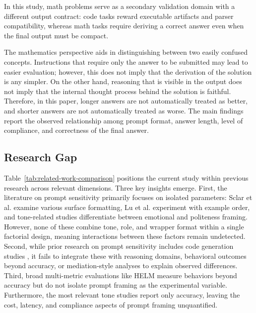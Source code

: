 \documentclass{llncs}
\begin{document}
In this study, math problems serve as a secondary validation domain with a different output contract: code tasks reward executable artifacts and parser compatibility, whereas math tasks require deriving a correct answer even when the final output must be compact.

The mathematics perspective aids in distinguishing between two easily confused concepts. Instructions that require only the answer to be submitted may lead to easier evaluation; however, this does not imply that the derivation of the solution is any simpler. On the other hand, reasoning that is visible in the output does not imply that the internal thought process behind the solution is faithful. Therefore, in this paper, longer answers are not automatically treated as better, and shorter answers are not automatically treated as worse. The main findings report the observed relationship among prompt format, answer length, level of compliance, and correctness of the final answer.

\subsection{Research Gap}\label{research-gap}

Table~\ref{tab:related-work-comparison} positions the current study within previous research across relevant dimensions. Three key insights emerge. First, the literature on prompt sensitivity primarily focuses on isolated parameters: Sclar et al. \citep{sclar2023spurious} examine various surface formatting, Lu et al. \citep{lu2021fantastically} experiment with example order, and tone-related studies \citep{li2023emotionprompt,yin2024politeness} differentiate between emotional and politeness framing. However, none of these combine tone, role, and wrapper format within a single factorial design, meaning interactions between these factors remain undetected. Second, while prior research on prompt sensitivity includes code generation studies \citep{zhuo2024prosa}, it fails to integrate these with reasoning domains, behavioral outcomes beyond accuracy, or mediation-style analyses to explain observed differences. Third, broad multi-metric evaluations like HELM \citep{liang2023helm} measure behaviors beyond accuracy but do not isolate prompt framing as the experimental variable. Furthermore, the most relevant tone studies report only accuracy, leaving the cost, latency, and compliance aspects of prompt framing unquantified.
\end{document}
